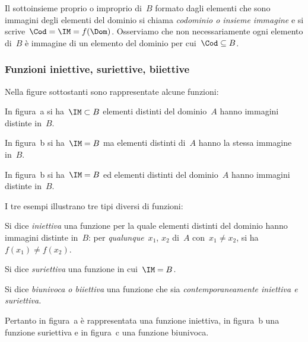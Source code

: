 Il sottoinsieme proprio o improprio di~$B$ formato dagli elementi che sono
immagini degli elementi del dominio si chiama
\emph{codominio o insieme immagine} e si scrive~$\Cod = \IM = f(\Dom)$. 
Osserviamo che non necessariamente
ogni elemento di~$B$ è immagine di un elemento del dominio per 
cui~$\Cod\subseteq B$.


\subsubsection{Funzioni iniettive, suriettive, biiettive}

\begin{exrig}
 \begin{esempio}
Nella figure sottostanti sono rappresentate alcune funzioni:
\begin{center}
 
\end{center}

In figura~a si ha~$\IM\subset B$ elementi distinti del dominio~$A$ hanno 
immagini distinte in~$B$.

In figura~b si ha~$\IM=B$ ma elementi distinti di~$A$ hanno la stessa immagine 
in~$B$.

In figura~b si ha~$\IM=B$ ed elementi distinti del dominio~$A$ hanno immagini 
distinte in~$B$.
 \end{esempio}
\end{exrig}

I tre esempi illustrano tre tipi diversi di funzioni:

\begin{definizione}
Si dice \emph{iniettiva} una funzione per la quale elementi distinti del
dominio hanno immagini distinte in~$B$: per \emph{qualunque}~$x_1$, $x_2$ di~$A$
con~$x_1\neq x_2$, si ha~$f(x_1)\neq f(x_2)$.
\end{definizione}

\begin{definizione}
Si dice \emph{suriettiva} una funzione in cui~$\IM = B$.
\end{definizione}

\begin{definizione}
Si dice \emph{biunivoca o biiettiva} una funzione che sia
\emph{contemporaneamente iniettiva e suriettiva.}
\end{definizione}

Pertanto in figura~a è rappresentata una funzione iniettiva, in figura~b una
funzione suriettiva e in figura~c una funzione biunivoca.

